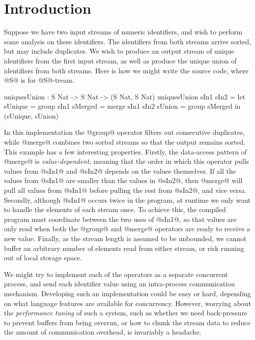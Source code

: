 \section{Introduction}
\label{s:Introduction}

Suppose we have two input streams of numeric identifiers, and wish to perform some analysis on these identifiers. The identifiers from both streams arrive sorted, but may include duplicates. We wish to produce an output stream of unique identifiers from the first input stream, as well as produce the unique union of identifiers from both streams. Here is how we might write the source code, where @S@ is for @S@-tream.
\begin{code}
  uniquesUnion : S Nat -> S Nat -> (S Nat, S Nat)
  uniquesUnion sIn1 sIn2
   = let  sUnique = group sIn1
          sMerged = merge sIn1 sIn2
          sUnion  = group sMerged
     in   (sUnique, sUnion)
\end{code}


In this implementation the @group@ operator filters out consecutive duplicates, while @merge@ combines two sorted streams so that the output remains sorted. This example has a few interesting properties. Firstly, the data-access pattern of @merge@ is \emph{value-dependent}, meaning that the order in which this operator pulls values from @sIn1@ and @sIn2@ depends on the values themselves. If all the values from @sIn1@ are smaller than the values in @sIn2@, then @merge@ will pull all values from @sIn1@ before pulling the rest from @sIn2@, and vice versa. Secondly, although @sIn1@ occurs twice in the program, at runtime we only want to handle the elements of each stream once. To achieve this, the compiled program must coordinate between the two uses of @sIn1@, so that values are only read when both the @group@ and @merge@ operators are ready to receive a new value. Finally, as the stream length is assumed to be unbounded, we cannot buffer an arbitrary number of elements read from either stream, or risk running out of local storage space.

We might try to implement each of the operators as a separate concurrent process, and send each identifier value using an intra-process communication mechanism. Developing such an implementation could be easy or hard, depending on what language features are available for concurrency. However, worrying about the \emph{performance tuning} of such a system, such as whether we need back-pressure to prevent buffers from being overrun, or how to chunk the stream data to reduce the amount of communication overhead, is invariably a headache. 

